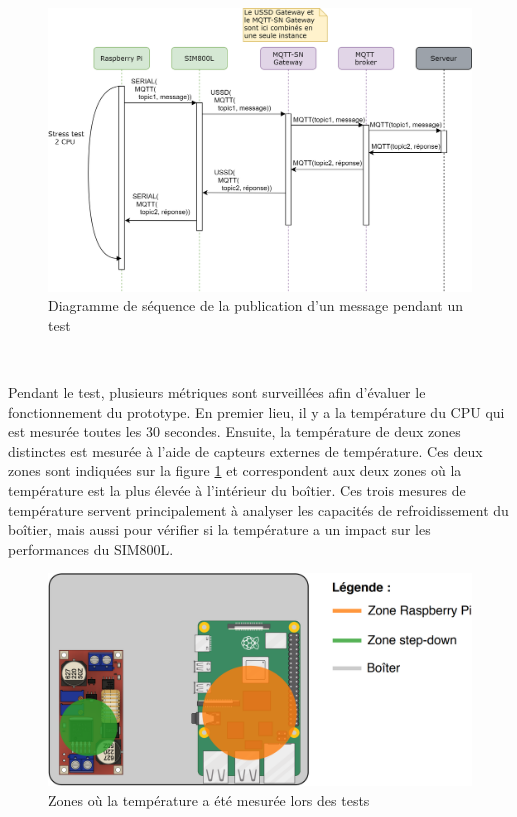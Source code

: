 \begin{figure}[ht!]
  \includegraphics[width=\textwidth]{img/el_prototype/diagram_test.png}
  \caption{Diagramme de séquence de la publication d'un message pendant un test}
  \label{fig:dia_test}
\end{figure}


~

\vspace{-0.5cm}

\noindent
Pendant le test, plusieurs métriques sont surveillées afin d’évaluer le fonctionnement du prototype. En premier lieu, il y a la température du CPU qui est mesurée toutes les 30 secondes. Ensuite, la température de deux zones distinctes est mesurée à l’aide de capteurs externes de température. Ces deux zones sont indiquées sur la figure \ref{fig:dia_test} et correspondent aux deux zones où la température est la plus élevée à l’intérieur du boîtier. Ces trois mesures de température servent principalement à analyser les capacités de refroidissement du boîtier, mais aussi pour vérifier si la température a un impact sur les performances du SIM800L.

\begin{figure}[ht!]
  \centering
  \includegraphics[scale=0.25]{img/el_prototype/zones_temperature.png}
  \caption{Zones où la température a été mesurée lors des tests}
  \label{fig:temp_zones}
\end{figure}

